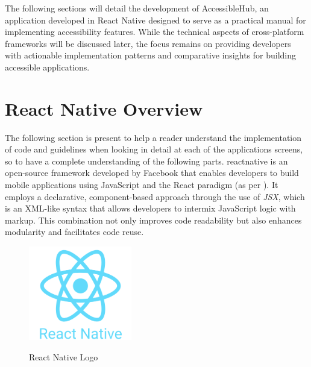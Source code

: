 The following sections will detail the development of AccessibleHub, an application developed in React Native designed to serve as a practical manual for implementing accessibility features. While the technical aspects of cross-platform frameworks will be discussed later, the focus remains on providing developers with actionable implementation patterns and comparative insights for building accessible applications.

\section{React Native Overview}
\label{sec:reactnative-overview}

The following section is present to help a reader understand the implementation of code and guidelines when looking in detail at each of the applications screens, so to have a complete understanding of the following parts. \gls{reactnative} is an open-source framework developed by Facebook that enables developers to build mobile applications using JavaScript and the React paradigm (as per \cite{site:reactnative}). It employs a declarative, component-based approach through the use of \textit{JSX}, which is an XML-like syntax that allows developers to intermix JavaScript logic with markup. This combination not only improves code readability but also enhances modularity and facilitates code reuse.

\begin{figure}[ht]
    \centering
    \includegraphics[width=0.4\textwidth, alt={React Native Logo}]{img/react-native-logo.png}
    \caption{React Native Logo}
    \label{fig:reactnative-logo}
\end{figure}

